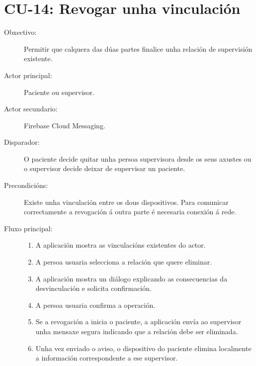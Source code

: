 
\section{CU-14: Revogar unha vinculación}
\label{cu:revogar-vinculacion}

\begin{description}

\item[Obxectivo:] Permitir que calquera das dúas partes finalice unha relación
de supervisión existente.

\item[Actor principal:] Paciente ou supervisor.

\item[Actor secundario:] Firebase Cloud Messaging.

\item[Disparador:] O paciente decide quitar unha persoa supervisora desde os seus
axustes ou o supervisor decide deixar de supervisar un paciente.

\item[Precondicións:] Existe unha vinculación entre os dous dispositivos. Para
comunicar correctamente a revogación á outra parte é necesaria conexión á rede.

\item[Fluxo principal:] \hfill
\begin{enumerate}
    \item A aplicación mostra as vinculacións existentes do actor.

    \item A persoa usuaria selecciona a relación que quere eliminar.

    \item A aplicación mostra un diálogo explicando as consecuencias da
    desvinculación e solicita confirmación.

    \item A persoa usuaria confirma a operación.

    \item Se a revogación a inicia o paciente, a aplicación envía ao supervisor
    unha mensaxe segura indicando que a relación debe ser eliminada.

    \item Unha vez enviado o aviso, o dispositivo do paciente elimina localmente
    a información correspondente a ese supervisor.


\end{enumerate}
\end{description}
